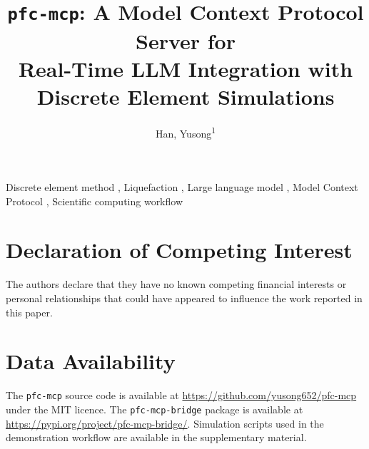 \documentclass[a4paper]{article}
\begin{document}
\title{\texttt{pfc-mcp}: A Model Context Protocol Server for\\
Real-Time LLM Integration with Discrete Element Simulations}

\author{
  Han, Yusong\textsuperscript{1} \and
}

\date{}

\maketitle

\begin{abstract}
\end{abstract}

\begin{keyword}
Discrete element method \sep
Liquefaction \sep
Large language model \sep
Model Context Protocol \sep
Scientific computing workflow
\end{keyword}






\section*{Declaration of Competing Interest}
The authors declare that they have no known competing financial interests or personal relationships that could have appeared to influence the work reported in this paper.

\section*{Data Availability}
The \texttt{pfc-mcp} source code is available at \url{https://github.com/yusong652/pfc-mcp} under the MIT licence. The \texttt{pfc-mcp-bridge} package is available at \url{https://pypi.org/project/pfc-mcp-bridge/}. Simulation scripts used in the demonstration workflow are available in the supplementary material.



\end{document}
